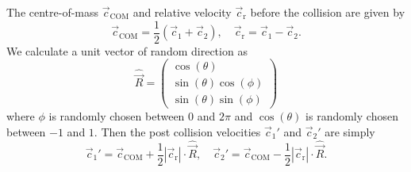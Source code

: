 The centre-of-mass $\vec{c}_\text{COM}$ and relative velocity $\vec{c}_\text{r}$ before the collision are given by
\begin{equation*}
    \vec{c}_\text{COM} = \frac{1}{2}(\vec{c}_1 + \vec{c}_2), \quad \vec{c}_\text{r} = \vec{c}_1 - \vec{c}_2.
\end{equation*}
We calculate a unit vector of random direction as
\begin{equation*}
    \hat{\vec{R}} = \begin{pmatrix}
        \cos(\theta) \\ \sin(\theta) \cos(\phi) \\ \sin(\theta) \sin(\phi)
    \end{pmatrix}
\end{equation*}
where $\phi$ is randomly chosen between $0$ and $2\pi$ and $\cos(\theta)$ is randomly chosen between $-1$ and $1$.
Then the post collision velocities $\vec{c}_1'$ and $\vec{c}_2'$ are simply
\begin{equation*}
    \vec{c}_1' = \vec{c}_\text{COM} + \frac{1}{2} |\vec{c}_\text{r}| \cdot \hat{\vec{R}}, \quad \vec{c}_2' = \vec{c}_\text{COM} - \frac{1}{2} |\vec{c}_\text{r}| \cdot \hat{\vec{R}}.
\end{equation*}





